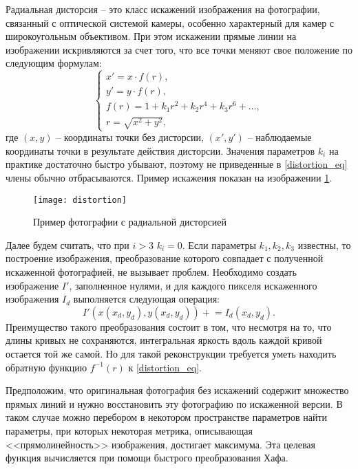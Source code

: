 
Радиальная дисторсия -- это класс искажений изображения на фотографии, связанный с оптической системой камеры, особенно характерный для камер с широкоугольным объективом. При этом искажении прямые линии на изображении искривляются за счет того, что все точки меняют свое положение по следующим формулам:
\begin{equation}
\label{distortion_eq}
    \begin{cases}
        x' = x \cdot f(r), \\
        y' = y \cdot f(r), \\
        f(r) = 1 + k_1 r^2 + k_2 r^4 + k_3 r^6 + \dots, \\
        r = \sqrt{x^2 + y^2},
    \end{cases}
\end{equation}
где $(x, y)$ -- координаты точки без дисторсии, $(x', y')$ -- наблюдаемые координаты точки в результате действия дисторсии. Значения параметров $k_i$ на практике достаточно быстро убывают, поэтому не приведенные в \eqref{distortion_eq} члены обычно отбрасываются. Пример искажения показан на изображении \ref{img:distortion}.

\begin{figure}[!h]
    \centering
    \texttt{[image: distortion]}
    \caption{Пример фотографии с радиальной дисторсией}
    \label{img:distortion}
\end{figure}

Далее будем считать, что при $i>3$ $k_i = 0$. Если параметры $k_1, k_2, k_3$ известны, то построение изображения, преобразование которого совпадает с полученной искаженной фотографией, не вызывает проблем. Необходимо создать изображение $I'$, заполненное нулями, и для каждого пикселя искаженного изображения $I_d$ выполняется следующая операция:
\begin{equation*}
    I'(x(x_d, y_d), y(x_d, y_d)) \mathrel{+}= I_d(x_d, y_d).
\end{equation*}
Преимущество такого преобразования состоит в том, что несмотря на то, что длины кривых не сохраняются, интегральная яркость вдоль каждой кривой остается той же самой. Но для такой реконструкции требуется уметь находить обратную функцию $f^{-1}(r)$ к \eqref{distortion_eq}.

Предположим, что оригинальная фотография без искажений содержит множество прямых линий и нужно восстановить эту фотографию по искаженной версии. В таком случае можно перебором в некотором пространстве параметров найти параметры, при которых некоторая метрика, описывающая <<прямолинейность>> изображения, достигает максимума. Эта целевая функция вычисляется при помощи быстрого преобразования Хафа.

